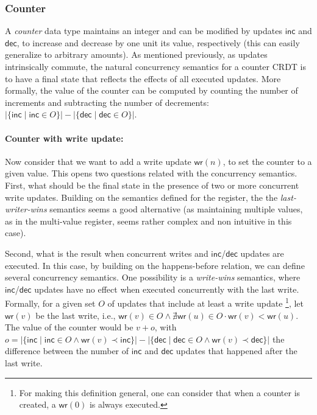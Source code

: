 \documentclass[12pt]{article}
\def\land{\mathrel{\wedge}}
\begin{document}
\subsubsection{Counter}
A \emph{counter} data type maintains an integer and can be modified 
by updates $\mathsf{inc}$ and $\mathsf{dec}$, 
to increase and decrease by one unit its value, respectively
(this can easily generalize to arbitrary amounts).
As mentioned previously, as updates intrinsically commute, the natural
concurrency semantics for a counter CRDT \cite{Shapiro11Conflict} is to have a final state that 
reflects the effects of all executed updates. 
More formally, the value of the counter can be computed by 
counting the number of increments and subtracting the number of decrements: 
$\left| \{ \mathsf{inc} \mid \mathsf{inc} \in O \} \right| - \left| \{ \mathsf{dec} \mid \mathsf{dec} \in O \} \right|$. 

\paragraph{Counter with write update:}
Now consider that we want to add a write update $\mathsf{wr}(n)$, to set
the counter to a given value. 
This opens two questions related with the concurrency semantics.
First, what should be the final state in the presence of 
two or more concurrent write updates. 
Building on the semantics defined for the register, the 
the \emph{last-writer-wins} semantics seems a good alternative 
(as maintaining multiple values, as in the multi-value register, 
seems rather complex and non intuitive in this case).

Second, what is the result when concurrent writes and $\mathsf{inc}$/$\mathsf{dec}$ updates 
are executed. 
In this case, by building on the happens-before relation, we can 
define several concurrency semantics.  
One possibility is a \emph{write-wins} semantics, where $\mathsf{inc}$/$\mathsf{dec}$ 
updates have no effect when executed concurrently with the 
last write.
Formally, for a given set $O$ of updates that include at least a write update \footnote{For making this definition general, one can consider that when a counter is created, a $\mathsf{wr}(0)$ is always executed.},
let $\mathsf{wr}(v)$ be the last write, i.e., $\mathsf{wr}(v) \in O \land \nexists \mathsf{wr}(u) \in O \cdot \mathsf{wr}(v) < \mathsf{wr}(u)$. 
The value of the counter would be
$v + o$, 
with $o = \left| \{ \mathsf{inc} \mid \mathsf{inc} \in O \wedge \mathsf{wr}(v) \prec \mathsf{inc}\} \right| - \left| \{ \mathsf{dec} \mid \mathsf{dec} \in O \wedge \mathsf{wr}(v) \prec \mathsf{dec}\} \right|$
the difference between the number of $\mathsf{inc}$ and $\mathsf{dec}$ updates that happened after the last write.
\end{document}
